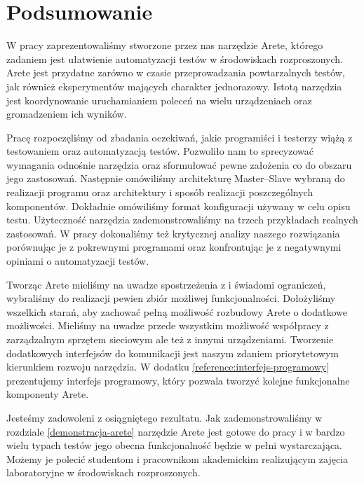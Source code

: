 \documentclass[00-praca-magisterska.tex]{subfiles}
\begin{document}
\chapter*{Podsumowanie}

W pracy zaprezentowaliśmy stworzone przez nas narzędzie Arete, którego zadaniem jest ułatwienie
automatyzacji testów w środowiskach rozproszonych. Arete jest przydatne zarówno
w czasie przeprowadzania powtarzalnych testów, jak również eksperymentów
mających charakter jednorazowy. Istotą narzędzia jest koordynowanie
uruchamianiem poleceń na wielu urządzeniach oraz gromadzeniem ich wyników.

Pracę rozpoczęliśmy od zbadania oczekiwań, jakie programiści i testerzy wiążą z testowaniem oraz
automatyzacją testów. Pozwoliło nam to sprecyzować wymagania odnośnie narzędzia
oraz sformułować pewne założenia co do obszaru jego zastosowań.  Następnie
omówiliśmy architekturę Master--Slave wybraną do realizacji programu oraz
architektury i sposób realizacji poszczególnych komponentów. Dokładnie
omówiliśmy format konfiguracji używany w celu opisu testu. Użyteczność narzędzia
zademonstrowaliśmy na trzech przykładach realnych zastosowań. W pracy
dokonaliśmy też krytycznej analizy naszego rozwiązania porównując je z
pokrewnymi programami oraz konfrontując je z negatywnymi opiniami o
automatyzacji testów.

Tworząc Arete mieliśmy na uwadze spostrzeżenia z \cite{snake-oil} i
świadomi ograniczeń, wybraliśmy do realizacji pewien zbiór możliwej
funkcjonalności. Dołożyliśmy wszelkich starań, aby zachować pełną możliwość
rozbudowy Arete o dodatkowe możliwości. Mieliśmy na uwadze przede wszystkim
możliwość współpracy z zarządzalnym sprzętem sieciowym ale też z innymi
urządzeniami. Tworzenie dodatkowych interfejsów do komunikacji jest naszym
zdaniem priorytetowym kierunkiem rozwoju narzędzia. W dodatku \ref{reference:interfejs-programowy}
prezentujemy interfejs programowy, który pozwala tworzyć kolejne funkcjonalne
komponenty Arete.

Jesteśmy zadowoleni z osiągniętego rezultatu. Jak zademonstrowaliśmy w
rozdziale \ref{demonstracja-arete} narzędzie Arete jest gotowe do pracy i w
bardzo wielu typach testów jego obecna funkcjonalność będzie w pełni
wystarczająca.  Możemy je polecić studentom i pracownikom akademickim
realizującym zajęcia laboratoryjne w środowiskach rozproszonych.
\end{document}
